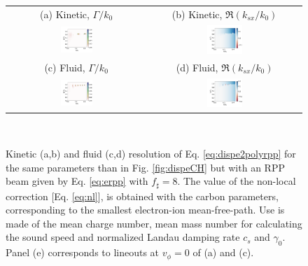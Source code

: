 \documentclass[
 reprint,
 amsmath,amssymb,
 aps,
]{revtex4-1}
\begin{document}
\begin{figure}
\begin{tabular}{cc}
(a) Kinetic, $\Gamma/k_0$ &
(b)  Kinetic, $\Re(k_{sx}/k_0)$ \\
\includegraphics[width=0.24\textwidth]{gkCH300eV.png}&
\includegraphics[width=0.24\textwidth]{kkCH300eV.png}\\
(c) Fluid, $\Gamma/k_0$  &
(d) Fluid, $\Re(k_{sx}/k_0)$  \\
\includegraphics[width=0.24\textwidth]{gfCH300eV.png}&
\includegraphics[width=0.24\textwidth]{kfCH300eV.png}
\end{tabular}
\\
\caption{ \label{fig:dispeCHrpp}  
Kinetic (a,b) and fluid (c,d) resolution of Eq. \eqref{eq:dispe2polyrpp} for  the same parameters than in Fig. \ref{fig:dispeCH} but with an RPP beam given by Eq. \eqref{eq:erpp} with $f_\sharp=8$.  The value of the non-local correction [Eq. \eqref{eq:nl}], is obtained with the carbon parameters, corresponding to the smallest electron-ion mean-free-path. Use is made of the mean charge number, mean mass number   for calculating the sound speed and normalized Landau damping rate $c_s$ and $\gamma_0$.
Panel (e) corresponds to lineouts at $v_\phi=0$ of (a) and (c). 
 }
\end{figure}
\end{document}
